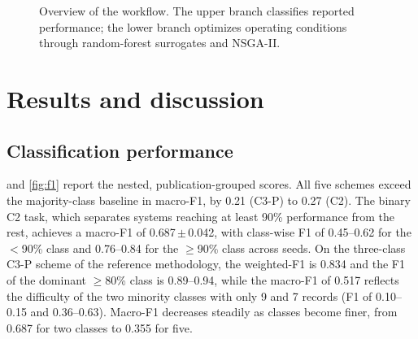 \documentclass[10pt,a4paper]{article}
\newcommand{\FoneCtwo}{0.687}        \newcommand{\FoneCtwoSD}{0.042}
\newcommand{\FoneCthreeP}{0.517}     \newcommand{\FoneCthreePSD}{0.040}
\newcommand{\FoneCthreePW}{0.834}    \newcommand{\BaseCthreeP}{0.310}
\newcommand{\FoneCfiveP}{0.355}      \newcommand{\FoneCfivePSD}{0.036}
\begin{document}
\begin{figure}[t]
\centering
{}
\caption{Overview of the workflow. The upper branch classifies reported
performance; the lower branch optimizes operating conditions through
random-forest surrogates and NSGA-II.}
\label{fig:workflow}
\end{figure}

\section{Results and discussion}
\label{sec:results}

\subsection{Classification performance}
\label{sec:clf}

 and \cref{fig:f1} report the nested, publication-grouped
scores. All five schemes exceed the majority-class baseline in macro-F1, by
0.21 (C3-P) to 0.27 (C2). The binary C2 task, which separates systems reaching
at least 90\% performance from the rest, achieves a macro-F1 of
\FoneCtwo{}\,$\pm$\,\FoneCtwoSD{}, with class-wise F1 of 0.45--0.62 for the
$<$90\% class and 0.76--0.84 for the $\geq$90\% class across seeds. On the
three-class C3-P scheme of the reference methodology, the weighted-F1 is
\FoneCthreePW{} and the F1 of the dominant $\geq$80\% class is 0.89--0.94,
while the macro-F1 of \FoneCthreeP{} reflects the difficulty of the two
minority classes with only 9 and 7 records (F1 of 0.10--0.15 and 0.36--0.63).
Macro-F1 decreases steadily as classes become finer, from \FoneCtwo{} for two
classes to \FoneCfiveP{} for five.
\end{document}

